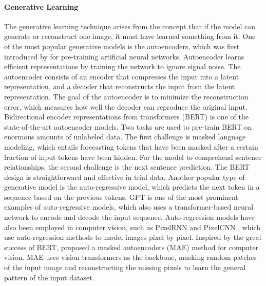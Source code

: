 \documentclass[11pt,titlepage,openright]{book}
\begin{document}
\paragraph{\textbf{Generative Learning}} The generative learning technique arises from the concept that if the model can generate or reconstruct one image, it must have learned something from it. One of the most popular generative models is the autoencoders, which was first introduced by \cite{ballard1987modular} for pre-training artificial neural networks. Autoencoder learns efficient representations by training the network to ignore signal noise. The autoencoder consists of an encoder that compresses the input into a latent representation, and a decoder that reconstructs the input from the latent representation. The goal of the autoencoder is to minimize the reconstruction error, which measures how well the decoder can reproduce the original input. Bidirectional encoder representations from transformers (BERT) \citep{devlin2018bert} is one of the state-of-the-art autoencoder models. Two tasks are used to pre-train BERT \citep{devlin2018bert} on enormous amounts of unlabeled data. The first challenge is masked language modeling, which entails forecasting tokens that have been masked after a certain fraction of input tokens have been hidden. For the model to comprehend sentence relationships, the second challenge is the next sentence prediction. The BERT \citep{devlin2018bert} design is straightforward and effective in trial data. Another popular type of generative model is the auto-regressive model, which predicts the next token in a sequence based on the previous tokens. GPT \citep{brown2020language, radford2018improving, radford2019language} is one of the most prominent examples of auto-regressive models, which also uses a transformer-based neural network to encode and decode the input sequence. Auto-regression models have also been employed in computer vision, such as PixelRNN \citep{van2016pixel} and PixelCNN \citep{van2016conditional}, which use auto-regression methods to model images pixel by pixel. Inspired by the great success of BERT, \cite{he2022masked} proposed a masked autoencoders (MAE) method for computer vision. MAE uses vision transformers as the backbone, masking random patches of the input image and reconstructing the missing pixels to learn the general pattern of the input dataset. 
\end{document}
